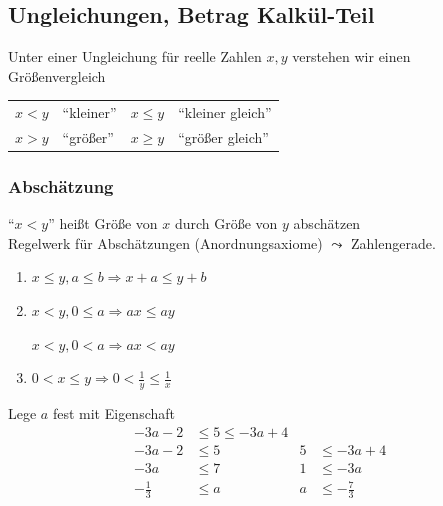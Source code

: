 \newpage
{}

\subsection{Ungleichungen, Betrag Kalkül-Teil}

\begin{definition}[Ungleichung]
Unter einer Ungleichung für reelle Zahlen $x,y$ verstehen wir einen Größenvergleich

  \begin{table}[h]
    \centering
    \begin{tabular}{|ll||ll|}
      \hline
      $x<y$ & ``kleiner'' & $x\leq y$ & ``kleiner gleich'' \\ 
      $x>y$ & ``größer'' & $x \geq y$ & ``größer gleich'' \\\hline
    \end{tabular}
  \end{table}
  
\end{definition}

\subsubsection*{Abschätzung}

``$x<y$'' heißt Größe von $x$ durch Größe von $y$ abschätzen\\
Regelwerk für Abschätzungen (Anordnungsaxiome) $\leadsto$ Zahlengerade.

\begin{enumerate}
 \item $x \leq y, a\leq b \Rightarrow x+a \leq y+b$
 \item $x<y, 0 \leq a \Rightarrow ax \leq ay$
 
$x<y, 0 < a \Rightarrow ax < ay$
 \item $0<x\leq y \Rightarrow 0 < \frac{1}{y} \leq \frac{1}{x}$
\end{enumerate}

\begin{example}
Lege $a$ fest mit Eigenschaft
\begin{align*}
-3a-2        &\leq 5 \leq -3a+4  &&\\
-3a-2        &\leq 5 & 5 &\leq -3a+4 \\
-3a          &\leq 7 & 1 &\leq -3a \\
-\frac{1}{3} &\leq a & a &\leq -\frac{7}{3}
\end{align*}

\end{example}

